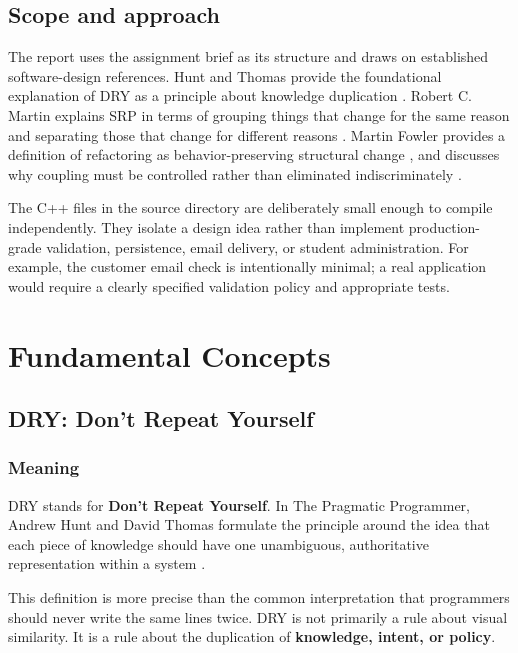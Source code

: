 \documentclass[12pt,a4paper]{article}
\begin{document}
\subsection{Scope and approach}

The report uses the assignment brief as its structure and draws on established software-design references. Hunt and Thomas provide the foundational explanation of DRY as a principle about knowledge duplication \cite{thomas2019pragmatic}. Robert C. Martin explains SRP in terms of grouping things that change for the same reason and separating those that change for different reasons \cite{martin2010srp}. Martin Fowler provides a definition of refactoring as behavior-preserving structural change \cite{fowler2004refactoring,fowler2018refactoring}, and discusses why coupling must be controlled rather than eliminated indiscriminately \cite{fowler2001coupling}.

The C++ files in the source directory are deliberately small enough to compile independently. They isolate a design idea rather than implement production-grade validation, persistence, email delivery, or student administration. For example, the customer email check is intentionally minimal; a real application would require a clearly specified validation policy and appropriate tests.

\section{Fundamental Concepts}

\subsection{DRY: Don't Repeat Yourself}

\subsubsection{Meaning}

DRY stands for \textbf{Don't Repeat Yourself}. In The Pragmatic Programmer, Andrew Hunt and David Thomas formulate the principle around the idea that each piece of knowledge should have one unambiguous, authoritative representation within a system \cite{thomas2019pragmatic}.

This definition is more precise than the common interpretation that programmers should never write the same lines twice. DRY is not primarily a rule about visual similarity. It is a rule about the duplication of \textbf{knowledge, intent, or policy}.
\end{document}
